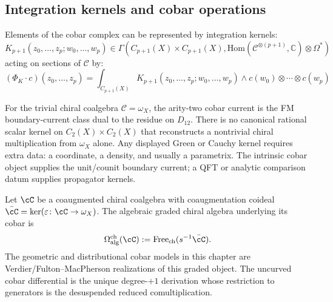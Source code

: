 \subsection{Integration kernels and cobar operations}

\begin{definition}\label{def:cobar-kernel}
Elements of the cobar complex can be represented by integration kernels:
\[
K_{p+1}(z_0, \ldots, z_p; w_0, \ldots, w_p) \in \Gamma\left(C_{p+1}(X) \times C_{p+1}(X), \text{Hom}(\mathcal{C}^{\otimes(p+1)}, \mathbb{C}) \otimes \Omega^*\right)
\]
acting on sections of $\mathcal{C}$ by:
\[
(\Phi_K \cdot c)(z_0, \ldots, z_p) = \int_{C_{p+1}(X)} K_{p+1}(z_0, \ldots, z_p; w_0, \ldots, w_p) \wedge c(w_0) \otimes \cdots \otimes c(w_p)
\]
\end{definition}

\begin{remark}\label{ex:fundamental-cobar}
For the trivial chiral coalgebra $\mathcal{C}=\omega_X$, the
arity-two cobar current is the FM boundary-current class dual to the
residue on $D_{12}$. There is no canonical rational scalar kernel on
$C_2(X)\times C_2(X)$ that reconstructs a nontrivial chiral
multiplication from $\omega_X$ alone. Any displayed Green or Cauchy
kernel requires extra data: a coordinate, a density, and usually a
parametrix. The intrinsic cobar object supplies the unit/counit
boundary current; a QFT or analytic comparison datum supplies
propagator kernels.
\end{remark}

\begin{definition}
\label{def:algebraic-cobar-free}
Let $\cC$ be a coaugmented chiral coalgebra with coaugmentation coideal
$\bar{\cC}=\ker(\varepsilon\colon\cC\to\omega_X)$.  The algebraic
graded chiral algebra underlying its cobar is
\[
\Omega^{\mathrm{ch}}_{\mathrm{alg}}(\cC)
:=\mathrm{Free}_{\mathrm{ch}}(s^{-1}\bar{\cC}).
\]
The geometric and distributional cobar models in this chapter are
Verdier/Fulton--MacPherson realizations of this graded object.  The
uncurved cobar differential is the unique degree-$+1$ derivation whose
restriction to generators is the desuspended reduced comultiplication.
\end{definition}

